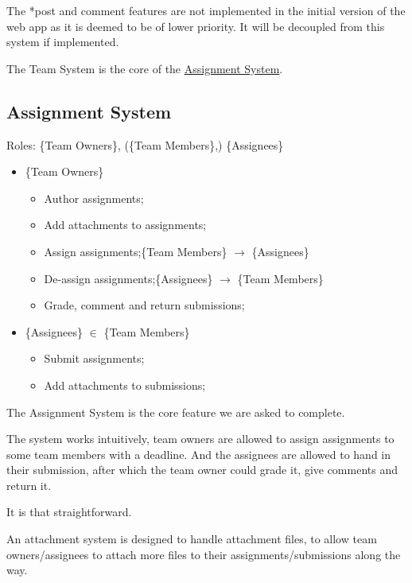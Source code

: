 \documentclass[12pt]{report}
\begin{document}
The *post and comment features are not implemented in the initial version of the web app
as it is deemed to be of lower priority. It will be decoupled from this system if implemented.
\vspace{1 em}

The Team System is the core of the \hyperref[overview.project-objectives.assignment-system]{Assignment System}.

\newpage
\subsection{Assignment System} \label{overview.project-objectives.assignment-system}

Roles: \{Team Owners\}, (\{Team Members\},) \{Assignees\}

\begin{itemize}
	\item \{Team Owners\}
	      \begin{itemize}
		      \item Author assignments;
		      \item Add attachments to assignments;
		      \item Assign assignments;\null\hfill \{Team Members\} $\rightarrow$ \{Assignees\}
		      \item De-assign assignments;\null\hfill \{Assignees\} $\rightarrow$ \{Team Members\}
		      \item Grade, comment and return submissions;
	      \end{itemize}
	\item \{Assignees\} $\in$ \{Team Members\}
	      \begin{itemize}
		      \item Submit assignments;
		      \item Add attachments to submissions;
	      \end{itemize}
\end{itemize}

The Assignment System is the core feature we are asked to complete.

The system works intuitively, team owners are allowed to assign assignments to some team members with a deadline.
And the assignees are allowed to hand in their submission,
after which the team owner could grade it, give comments and return it.

It is that straightforward.
\vspace{1 em}

An attachment system is designed to handle attachment files, to allow team owners/assignees
to attach more files to their assignments/submissions along the way.
\end{document}
